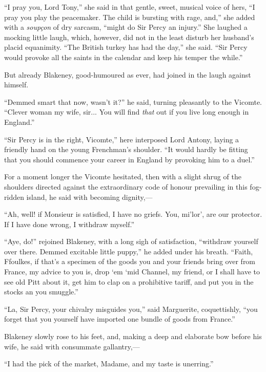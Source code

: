 \documentclass[paper=a5,BCOR=7mm,twoside,DIV=calc,12pt,usegeometry,chapterprefix,endperiod,headings=big]{scrbook}
\begin{document}
\enquote{I pray you, Lord Tony,} she said in that gentle, sweet, musical voice of hers, \enquote{I pray you play the peacemaker. The child is bursting with rage, and,} she added with a \textit{soupçon} of dry sarcasm, \enquote{might do Sir Percy an injury.} She laughed a mocking little laugh, which, however, did not in the least disturb her husband's placid equanimity. \enquote{The British turkey has had the day,} she said. \enquote{Sir Percy would provoke all the saints in the calendar and keep his temper the while.}

But already Blakeney, good-humoured as ever, had joined in the laugh against himself.

\enquote{Demmed smart that now, wasn't it?} he said, turning pleasantly to the Vicomte. \enquote{Clever woman my wife, sir... You will find \textit{that} out if you live long enough in England.}

\enquote{Sir Percy is in the right, Vicomte,} here interposed Lord Antony, laying a friendly hand on the young Frenchman's shoulder. \enquote{It would hardly be fitting that you should commence your career in England by provoking him to a duel.}

For a moment longer the Vicomte hesitated, then with a slight shrug of the shoulders directed against the extraordinary code of honour prevailing in this fog-ridden island, he said with becoming dignity,---

\enquote{Ah, well! if Monsieur is satisfied, I have no griefs. You, mi'lor’, are our protector. If I have done wrong, I withdraw myself.}

\enquote{Aye, do!} rejoined Blakeney, with a long sigh of satisfaction, \enquote{withdraw yourself over there. Demmed excitable little puppy,} he added under his breath. \enquote{Faith, Ffoulkes, if that's a specimen of the goods you and your friends bring over from France, my advice to you is, drop `em `mid Channel, my friend, or I shall have to see old Pitt about it, get him to clap on a prohibitive tariff, and put you in the stocks an you smuggle.}

\enquote{La, Sir Percy, your chivalry misguides you,} said Marguerite, coquettishly, \enquote{you forget that you yourself have imported one bundle of goods from France.}

Blakeney slowly rose to his feet, and, making a deep and elaborate bow before his wife, he said with consummate gallantry,---

\enquote{I had the pick of the market, Madame, and my taste is unerring.}
\end{document}
